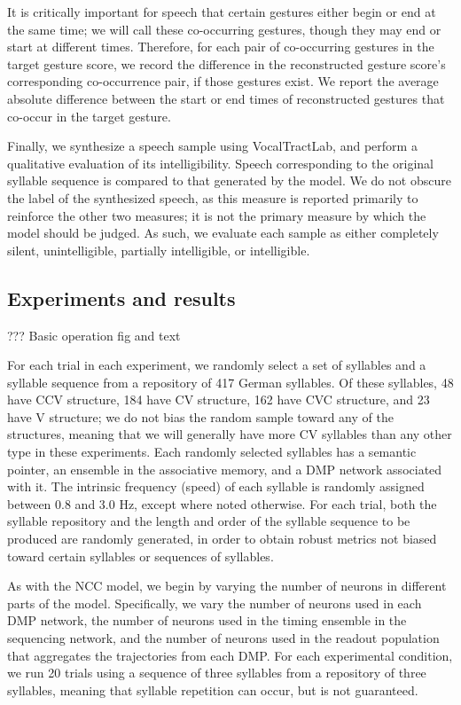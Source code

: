 It is critically important
for speech that certain gestures
either begin or end at the same time;
we will call these co-occurring gestures,
though they may end or start at different times.
Therefore, for each pair
of co-occurring gestures in the
target gesture score,
we record the difference
in the reconstructed gesture score's
corresponding co-occurrence pair,
if those gestures exist.
We report the average absolute
difference between the start or end times
of reconstructed gestures
that co-occur in the target gesture.

Finally, we synthesize a speech sample
using VocalTractLab,
and perform a qualitative evaluation
of its intelligibility.
Speech corresponding to the
original syllable sequence is compared
to that generated by the model.
We do not obscure the label
of the synthesized speech,
as this measure is reported primarily
to reinforce the other two measures;
it is not the primary measure
by which the model should be judged.
As such, we evaluate each sample
as either completely silent,
unintelligible, partially intelligible,
or intelligible.

\subsection{Experiments and results}

??? Basic operation fig and text

For each trial in each experiment,
we randomly select a set of syllables
and a syllable sequence
from a repository of 417 German syllables.
Of these syllables,
48 have CCV structure,
184 have CV structure,
162 have CVC structure,
and 23 have V structure;
we do not bias the random sample
toward any of the structures,
meaning that we will generally
have more CV syllables
than any other type in these experiments.
Each randomly selected syllables
has a semantic pointer,
an ensemble in the associative memory,
and a DMP network associated with it.
The intrinsic frequency (speed)
of each syllable is randomly assigned
between 0.8 and 3.0 Hz,
except where noted otherwise.
For each trial,
both the syllable repository
and the length and order
of the syllable sequence
to be produced are randomly generated,
in order to obtain robust metrics
not biased toward certain syllables
or sequences of syllables.

As with the NCC model,
we begin by varying the number of neurons
in different parts of the model.
Specifically, we vary the number of neurons
used in each DMP network,
the number of neurons used in the
timing ensemble in the sequencing network,
and the number of neurons used
in the readout population that
aggregates the trajectories
from each DMP.
For each experimental condition,
we run 20 trials using
a sequence of three syllables
from a repository of three syllables,
meaning that syllable repetition can occur,
but is not guaranteed.

